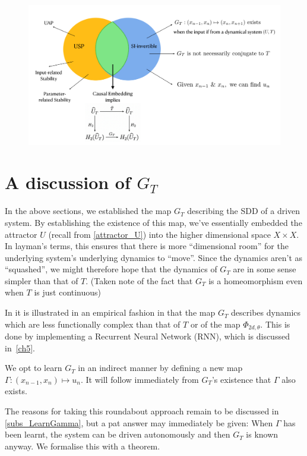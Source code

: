 \documentclass[a4paper,12pt,twoside]{report}
\begin{document}
\begin{figure}[ht]
  \includegraphics[scale=0.3]{_summarypictorial.png}
  \centering
  \label{fig:fig_pictorialSummary}
\end{figure}

\section{A discussion of $G_T$ }

In the above sections, we established the map $G_T$ describing the SDD of a driven system. By establishing the existence of this map, we’ve essentially embedded the attractor $U$ (recall from \ref{attractor_U}) into the higher dimensional space $X\times{X}$.
In layman’s terms, this ensures that there is more “dimensional room” for the underlying system’s underlying dynamics to “move”. Since the dynamics aren’t as “squashed”, we might therefore hope that the dynamics of $G_T$ are in some sense simpler than that of $T$. (Taken note of the fact that $G_T$ is a homeomorphism even when $T$ is just continuous)
 
In \cite{manjunath2021universal} it is illustrated in an empirical fashion in that the map $G_T$ describes dynamics which are less functionally complex than that of $T$ or of the map $\Phi_{2d,\theta}$. This is done by implementing a Recurrent Neural Network (RNN), which is discussed in~\ref{ch5}. 
 
We opt to learn $G_T$ in an indirect manner by defining a new map $\Gamma:(x_{n-1},x_n)\mapsto{u_n}$. It will follow immediately from $G_T$’s existence that $\Gamma$ also exists. 

The reasons for taking this roundabout approach remain to be discussed in \ref{subs_LearnGamma}, but a pat answer may immediately be given: When $\Gamma$ has been learnt, the system can be driven autonomously and then $G_T$ is known anyway. We formalise this with a theorem.
\end{document}
